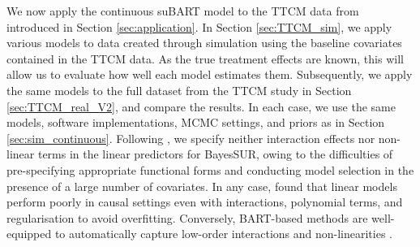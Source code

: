 \documentclass[aoas,preprint]{imsart}
\theoremstyle{plain}
\theoremstyle{definition}
\theoremstyle{remark}
\begin{document}
We now apply the continuous suBART model to the TTCM data from \citet{wiertsema2019cost} introduced in Section \ref{sec:application}. In Section \ref{sec:TTCM_sim}, we apply various models to data created through simulation using the baseline covariates contained in the TTCM data. 
As the true treatment effects are known, this will allow us to evaluate how well each model estimates them. Subsequently, we apply the same models to the full dataset from the TTCM study in Section \ref{sec:TTCM_real_V2}, and compare the results. In each case, we use the same models, software implementations, MCMC settings, and priors as in Section \ref{sec:sim_continuous}.
Following \citet{wiertsema2019cost}, we specify neither interaction effects nor non-linear terms in the linear predictors for BayesSUR, owing to the difficulties of pre-specifying appropriate functional forms and conducting model selection in the presence of a large number of covariates. In any case, \citet{dorie2019automated} found that linear models perform poorly in causal settings even with interactions, polynomial terms, and regularisation to avoid overfitting. Conversely, BART-based methods are well-equipped to automatically capture low-order interactions and non-linearities \citep{rockova2020semi,rockova2020posterior}.
\end{document}
